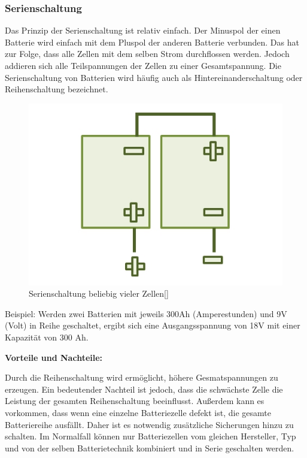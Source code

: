 \subsubsection{Serienschaltung}
Das Prinzip der Serienschaltung ist relativ einfach. Der Minuspol der einen Batterie wird einfach mit dem Pluspol der anderen Batterie verbunden. Das hat zur Folge, dass alle Zellen mit dem selben Strom durchflossen werden. Jedoch addieren sich alle Teilspannungen der Zellen zu einer Gesamtspannung. Die Serienschaltung von Batterien wird häufig auch als Hintereinanderschaltung oder Reihenschaltung bezeichnet.

\begin{figure}[H]
	\begin{center}
		\includegraphics[scale=1.0]{figures/Akku/SerienschaltungzweierBatterien.org.jpg}
		\caption{Serienschaltung beliebig vieler Zellen[\cite{ReihenschaltungZellen}]}
		\label{fig: Serienschaltung beliebig vieler Zellen}
	\end{center}
\end{figure}

Beispiel: Werden zwei Batterien mit jeweils 300Ah (Amperestunden) und 9V (Volt) in Reihe geschaltet, ergibt sich eine Ausgangsspannung von 18V mit einer Kapazität von 300 Ah. \medskip

\textbf{Vorteile und Nachteile:}

Durch die Reihenschaltung wird ermöglicht, höhere Gesmatspannungen zu erzeugen. Ein bedeutender Nachteil ist jedoch, dass die schwächste Zelle die Leistung der gesamten Reihenschaltung beeinflusst. Außerdem kann es vorkommen, dass wenn eine einzelne Batteriezelle defekt ist, die gesamte Batteriereihe ausfällt. Daher ist es notwendig zusätzliche Sicherungen hinzu zu schalten. Im Normalfall können nur Batteriezellen vom gleichen Hersteller, Typ und von der selben Batterietechnik kombiniert und in Serie geschalten werden.
\newpage

